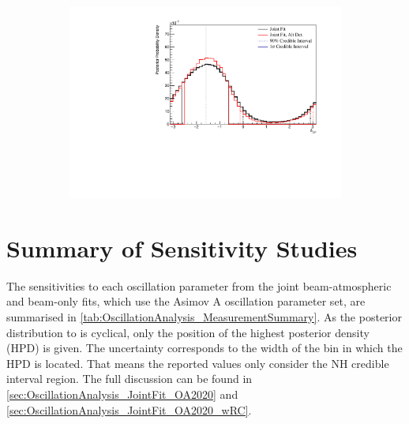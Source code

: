 \begin{figure}[h]
  \begin{subfigure}[t]{0.98\textwidth}
    \includegraphics[width=\textwidth, trim={0mm 0mm 0mm 0mm}, clip,page=1]{Figures/OA/JointFit_OA2020_AltDetModel/ContourComparison_1D_dcp_BH_2_woRC_UnSmeared_CredibleInterval.pdf}
  \end{subfigure}
  \caption{}
  \label{fig:OscillationAnalysis_ShiftSmear_DCP}
\end{figure}

\clearpage
\section{Summary of Sensitivity Studies}
\label{sec:OA_Summary}

The sensitivities to each oscillation parameter from the joint beam-atmospheric and beam-only fits, which use the Asimov A oscillation parameter set, are summarised in \autoref{tab:OscillationAnalysis_MeasurementSummary}. As the posterior distribution to  is cyclical, only the position of the highest posterior density (HPD) is given. The uncertainty corresponds to the width of the bin in which the HPD is located. That means the  reported values only consider the NH credible interval region. The full discussion can be found in \autoref{sec:OscillationAnalysis_JointFit_OA2020} and \autoref{sec:OscillationAnalysis_JointFit_OA2020_wRC}.

